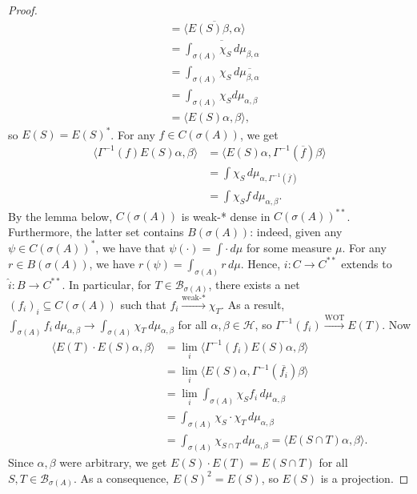\documentclass[10pt, a4paper]{article}
\newenvironment{noticeC}{%
  \tcolorbox[%
  notitle,
  empty,
  enhanced,  %
  breakable,
  coltext=black, 
  fontupper=\rmfamily,
  noparskip,
  sharp corners,
  boxrule=-1pt,  %
  frame hidden,
  left=7pt,  %
  right=7pt,
  top=5pt,
  bottom=5pt,
  before skip=2.5ex plus 2pt,
  after skip=2.5ex plus 2pt,
  overlay unbroken and last={%
  },
  ]}
{\endtcolorbox}
\newenvironment{myproof}%
  {\begin{noticeC}\begin{proof}}%
  {\end{proof}\end{noticeC}}
\begin{document}
\begin{myproof}
\begin{align*}
    &= \overline{\langle E(S) \beta, \alpha \rangle}\\
    &= \overline{\int_{\sigma(A)} \chi_S\, d\mu_{\beta, \alpha}}\\
    &= \int_{\sigma(A)} \chi_S\, d\overline{\mu_{\beta, \alpha}}\\
    &= \int_{\sigma(A)} \chi_S d\mu_{\alpha, \beta}\\
    &= \langle E(S) \alpha, \beta\rangle,
  \end{align*}
  so $E(S) = E(S)^*$.
  For any $f \in C(\sigma(A))$, we get 
  \begin{align*}
    \langle \Gamma^{-1} (f) E(S) \alpha, \beta \rangle &= \langle E(S) \alpha, \Gamma^{-1}(\overline{f})\beta\rangle\\
    &= \int \chi_S\, d\mu_{\alpha, \Gamma^{-1} (\overline{f})}\\
    &= \int \chi_S f\, d\mu_{\alpha, \beta}.
  \end{align*}
  By the lemma below, $C(\sigma(A))$ is weak-* dense in $C(\sigma(A))^{**}$.
  Furthermore, the latter set contains $B(\sigma(A))$: indeed, given any $\psi \in C(\sigma(A))^*$,
  we have that $\psi (\cdot) = \int \cdot \, d\mu$ for some measure $\mu$.
  For any $r \in B(\sigma(A))$, we have $r(\psi) = \int_{\sigma(A)} r\, d\mu$.
  Hence, $i: C \to C^{**}$ extends to $\widehat{i}: B \to C^{**}$.
  In particular, for $T \in \mathcal{B}_{\sigma(A)}$, there exists a net $(f_i)_i \subseteq C(\sigma(A))$
  such that $f_i \xrightarrow{\textrm{weak-*}} \chi_T$. As a result,
  $\int_{\sigma(A)} f_i\, d\mu_{\alpha, \beta} \to \int_{\sigma(A)} \chi_T \, d\mu_{\alpha, \beta}$ for all $\alpha, \beta \in \mathcal{H}$,
  so $\Gamma^{-1} (f_i) \xrightarrow{\textrm{WOT}} E(T)$. Now 
  \begin{align*}
    \langle E(T) \cdot E(S) \alpha, \beta\rangle &= \lim_{i} \langle \Gamma^{-1} (f_i) E(S)\alpha, \beta\rangle\\
    &= \lim_i \langle E(S) \alpha, \Gamma^{-1} (\overline{f_i})\beta \rangle\\
    &= \lim_i \int_{\sigma(A)} \chi_S f_i\, d\mu_{\alpha, \beta}\\
    &= \int_{\sigma(A)} \chi_S \cdot \chi_T\, d\mu_{\alpha, \beta}\\
    &= \int_{\sigma(A)} \chi_{S \cap T}\, d\mu_{\alpha, \beta} = \langle E(S \cap T) \alpha, \beta\rangle.
  \end{align*}
  Since $\alpha, \beta$ were arbitrary, we get $E(S) \cdot E(T) = E(S \cap T)$ for all $S, T \in \mathcal{B}_{\sigma(A)}$.
  As a consequence, $E(S)^2 = E(S)$, so $E(S)$ is a projection.

\end{myproof}
\end{document}
